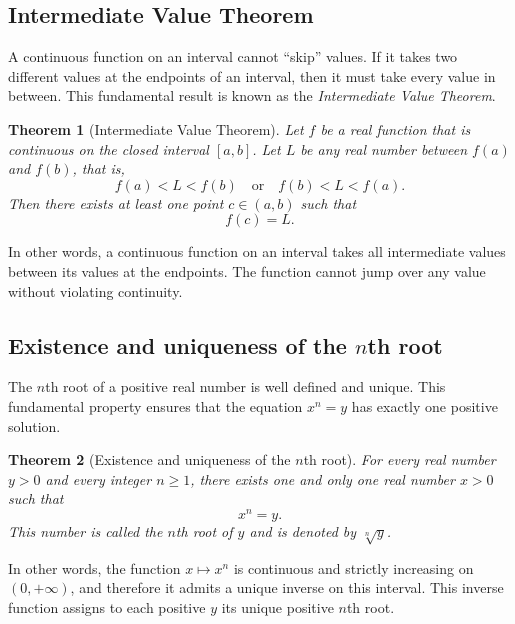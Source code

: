 \documentclass[11pt,a4paper]{article}
\theoremstyle{definition} \newtheorem{definition}{Definition} \theoremstyle{plain} \newtheorem{theorem}{Theorem}
\begin{document}
\subsection{Intermediate Value Theorem}
A continuous function on an interval cannot ``skip'' values.
If it takes two different values at the endpoints of an interval, then it must take every value in between.
This fundamental result is known as the \emph{Intermediate Value Theorem}.
\begin{theorem}[Intermediate Value Theorem]\label{thm:intermediate-value} Let $f$ be a real function that is continuous on the closed interval $[a,b]$. Let $L$ be any real number between $f(a)$ and $f(b)$, that is,
\[ f(a) < L < f(b) \quad \text{or} \quad f(b) < L < f(a). \]
Then there exists at least one point $c \in (a,b)$ such that
\[ f(c) = L. \]
\end{theorem}
In other words, a continuous function on an interval takes all intermediate values between its values at the endpoints.
The function cannot jump over any value without violating continuity.
\subsection{Existence and uniqueness of the \texorpdfstring{$n$}{n}th root}
The $n$th root of a positive real number is well defined and unique.
This fundamental property ensures that the equation $x^n = y$ has exactly one positive solution.
\begin{theorem}[Existence and uniqueness of the $n$th root]\label{thm:nth-root} For every real number $y>0$ and every integer $n \ge 1$, there exists one and only one real number $x>0$ such that
\[ x^n = y. \]
This number is called the $n$th root of $y$ and is denoted by $\sqrt[n]{y}$. \end{theorem}
In other words, the function $x \mapsto x^n$ is continuous and strictly increasing on $(0,+\infty)$, and therefore it admits a unique inverse on this interval.
This inverse function assigns to each positive $y$ its unique positive $n$th root.
\end{document}
